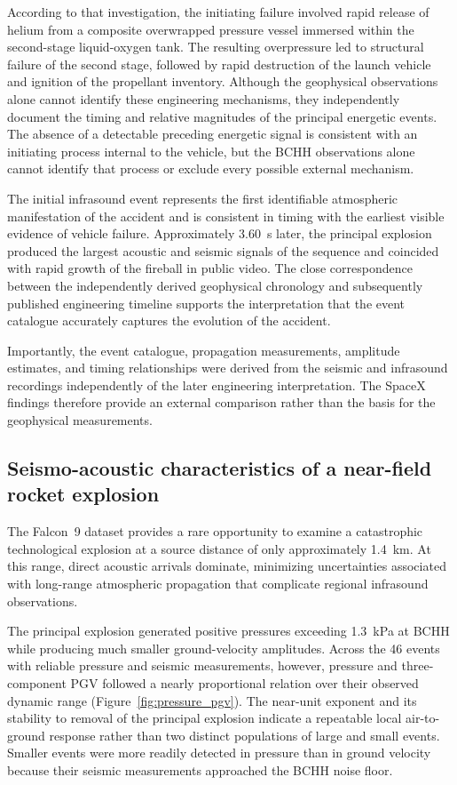 \documentclass[]{seismica}
\begin{document}
According to that investigation, the initiating failure involved rapid release
of helium from a composite overwrapped pressure vessel immersed within the
second-stage liquid-oxygen tank. The resulting overpressure led to structural
failure of the second stage, followed by rapid destruction of the launch
vehicle and ignition of the propellant inventory. Although the geophysical
observations alone cannot identify these engineering mechanisms, they
independently document the timing and relative magnitudes of the principal
energetic events. The absence of a detectable preceding energetic signal is
consistent with an initiating process internal to the vehicle, but the BCHH
observations alone cannot identify that process or exclude every possible
external mechanism.

The initial infrasound event represents the first identifiable atmospheric
manifestation of the accident and is consistent in timing with the earliest
visible evidence of vehicle failure. Approximately 3.60~s later, the principal
explosion produced the largest acoustic and seismic signals of the sequence and
coincided with rapid growth of the fireball in public video. The close
correspondence between the independently derived geophysical chronology and
subsequently published engineering timeline supports the interpretation that
the event catalogue accurately captures the evolution of the accident.

Importantly, the event catalogue, propagation measurements, amplitude estimates, and timing relationships were derived from the seismic and infrasound recordings independently of the later engineering interpretation. The SpaceX findings therefore provide an external comparison rather than the basis for the geophysical measurements.

\subsection{Seismo-acoustic characteristics of a near-field rocket explosion}
\label{sec:discussion_characteristics}

The Falcon~9 dataset provides a rare opportunity to examine a catastrophic technological explosion at a source distance of only approximately 1.4~km. At this range, direct acoustic arrivals dominate, minimizing uncertainties associated with long-range atmospheric propagation that complicate regional infrasound observations.

The principal explosion generated positive pressures exceeding 1.3~kPa at
BCHH while producing much smaller ground-velocity amplitudes. Across the 46
events with reliable pressure and seismic measurements, however, pressure and
three-component PGV followed a nearly proportional relation over their observed
dynamic range (Figure~\ref{fig:pressure_pgv}). The near-unit exponent and its
stability to removal of the principal explosion indicate a repeatable local
air-to-ground response rather than two distinct populations of large and small
events. Smaller events were more readily detected in pressure than in ground
velocity because their seismic measurements approached the BCHH noise floor.
\end{document}

